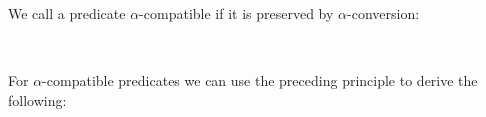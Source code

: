 \documentclass{entcs}
\newcommand{\alp}{\ensuremath{\alpha}}
\begin{document}
\hfill

We call a predicate \alp-compatible if it is preserved by  $\alpha$-conversion:


\begin{code}%
\> \AgdaSymbol{:} \AgdaSymbol{\{} \AgdaSymbol{:} \AgdaSymbol{\}}  \AgdaSymbol{(}   \AgdaSymbol{)}   \<%
\\
\>  \AgdaSymbol{=} \AgdaSymbol{\{}  \AgdaSymbol{:} \AgdaSymbol{\}}          \<%
\end{code}


For \alp-compatible predicates we can use the preceding principle to derive the following: 


\begin{code}%
\> \AgdaSymbol{:} \AgdaSymbol{\{} \AgdaSymbol{:} \AgdaSymbol{\}(} \AgdaSymbol{:}    \AgdaSymbol{)} \<[42]%
\>[42]\<%
\\
\>[0]\<[2]%
\>[2]   \<[22]%
\>[22]\<%
\\
\>[0]\<[2]%
\>[2]     \AgdaSymbol{(} \AgdaSymbol{))}\<%
\\
\>[0]\<[2]%
\>[2]            \AgdaSymbol{(}  \AgdaSymbol{))}\<%
\\
\>[0]\<[2]%
\>[2]                 \AgdaSymbol{(}  \AgdaSymbol{)))}\<%
\\
\>[0]\<[2]%
\>[2]     \<%
\end{code}
\end{document}

